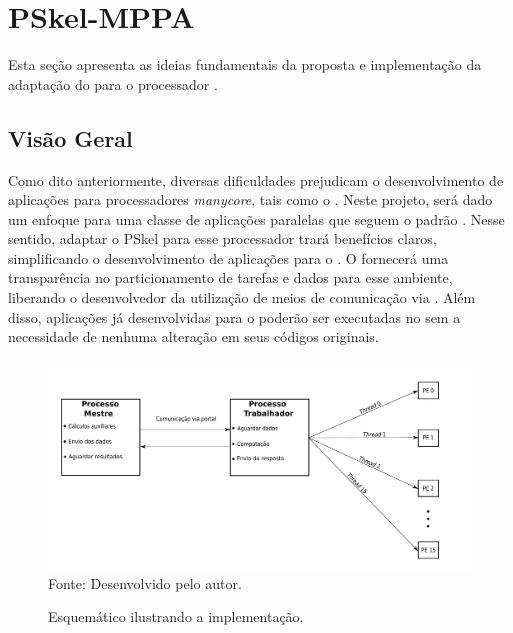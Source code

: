 \chapter{PSkel-MPPA}
\label{cha:proposta}

Esta seção apresenta as ideias fundamentais da proposta e implementação
da adaptação do \fw \pskel para o processador \mppa.

\section{Visão Geral}

Como dito anteriormente, diversas dificuldades prejudicam o desenvolvimento de aplicações para
processadores \textit{manycore}, tais como o \mppa. Neste projeto, será dado um enfoque para
uma classe de aplicações paralelas que seguem o padrão \stencil. Nesse sentido, adaptar
o \fw PSkel para esse processador trará benefícios claros, simplificando o desenvolvimento
de aplicações \stencil para o \mppa. O \fw fornecerá uma transparência
no particionamento de tarefas e dados para esse ambiente, liberando o desenvolvedor
da utilização de meios de comunicação via \noc. Além disso, aplicações já desenvolvidas para o
\fw poderão ser executadas no \mppa sem a necessidade de nenhuma alteração em
seus códigos originais.



\begin{figure}[t]
	\centering
    \caption{Esquemático ilustrando a implementação.}
    \includegraphics[width=\textwidth, height=!]{figs/visaoGeralPSKELMPPA.pdf} \\
    Fonte: Desenvolvido pelo autor.
    \label{fig:visaoGeral}
\end{figure}



